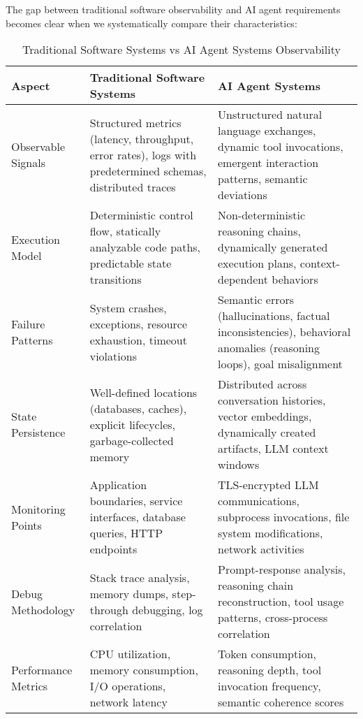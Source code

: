 The gap between traditional software observability and AI agent requirements becomes clear when we systematically compare their characteristics:

\begin{table*}[t]
  \caption{Traditional Software Systems vs AI Agent Systems Observability}
  \label{tab:diff}
  \begin{tabularx}{\linewidth}{@{}>{\raggedright\arraybackslash}p{2.85cm}X X@{}}
    \toprule
    \textbf{Aspect} &
    \textbf{Traditional Software Systems} &
    \textbf{AI Agent Systems} \\
    \midrule
    Observable Signals &
    Structured metrics (latency, throughput, error rates), logs with predetermined schemas, distributed traces &
    Unstructured natural language exchanges, dynamic tool invocations, emergent interaction patterns, semantic deviations \\
    Execution Model &
    Deterministic control flow, statically analyzable code paths, predictable state transitions &
    Non-deterministic reasoning chains, dynamically generated execution plans, context-dependent behaviors \\
    Failure Patterns &
    System crashes, exceptions, resource exhaustion, timeout violations &
    Semantic errors (hallucinations, factual inconsistencies), behavioral anomalies (reasoning loops), goal misalignment \\
    State Persistence &
    Well-defined locations (databases, caches), explicit lifecycles, garbage-collected memory &
    Distributed across conversation histories, vector embeddings, dynamically created artifacts, LLM context windows \\
    Monitoring Points &
    Application boundaries, service interfaces, database queries, HTTP endpoints &
    TLS-encrypted LLM communications, subprocess invocations, file system modifications, network activities \\
    Debug Methodology &
    Stack trace analysis, memory dumps, step-through debugging, log correlation &
    Prompt-response analysis, reasoning chain reconstruction, tool usage patterns, cross-process correlation \\
    Performance Metrics &
    CPU utilization, memory consumption, I/O operations, network latency &
    Token consumption, reasoning depth, tool invocation frequency, semantic coherence scores \\
    \bottomrule
  \end{tabularx}
\end{table*}

